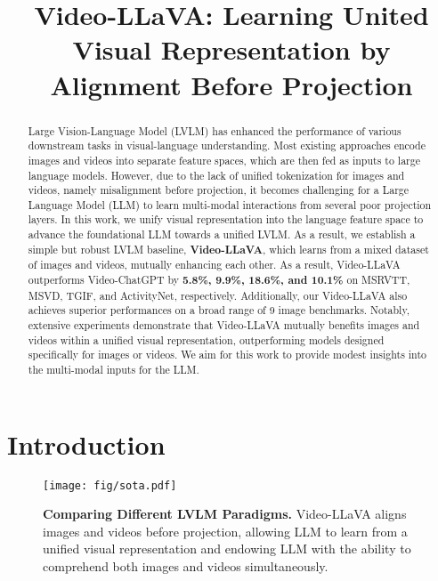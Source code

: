 \title{Video-LLaVA: Learning United Visual Representation by Alignment Before Projection}



\maketitle
\begin{abstract}
Large Vision-Language Model (LVLM) has enhanced the performance of various downstream tasks in visual-language understanding. Most existing approaches encode images and videos into separate feature spaces, which are then fed as inputs to large language models. However, due to the lack of unified tokenization for images and videos, namely misalignment before projection, it becomes challenging for a Large Language Model (LLM) to learn multi-modal interactions from several poor projection layers. 
In this work, we unify visual representation into the language feature space to advance the foundational LLM towards a unified LVLM. As a result, we establish a simple but robust LVLM baseline, \textbf{Video-LLaVA}, which learns from a mixed dataset of images and videos, mutually enhancing each other.
As a result, Video-LLaVA outperforms Video-ChatGPT by \textbf{5.8\%, 9.9\%, 18.6\%, and 10.1\%} on MSRVTT, MSVD, TGIF, and ActivityNet, respectively. Additionally, our Video-LLaVA also achieves superior performances on a broad range of 9 image benchmarks.
Notably, extensive experiments demonstrate that Video-LLaVA mutually benefits images and videos within a unified visual representation, outperforming models designed specifically for images or videos. We aim for this work to provide modest insights into the multi-modal inputs for the LLM.
\end{abstract}

\section{Introduction}

\label{sec:intro}
\begin{figure}[h]
\centering
    \texttt{[image: fig/sota.pdf]}     
\caption{\textbf{Comparing Different LVLM Paradigms.} Video-LLaVA aligns images and videos before projection, allowing LLM to learn from a unified visual representation and endowing LLM with the ability to comprehend both images and videos simultaneously.}
\label{fig:sota}
\end{figure}

